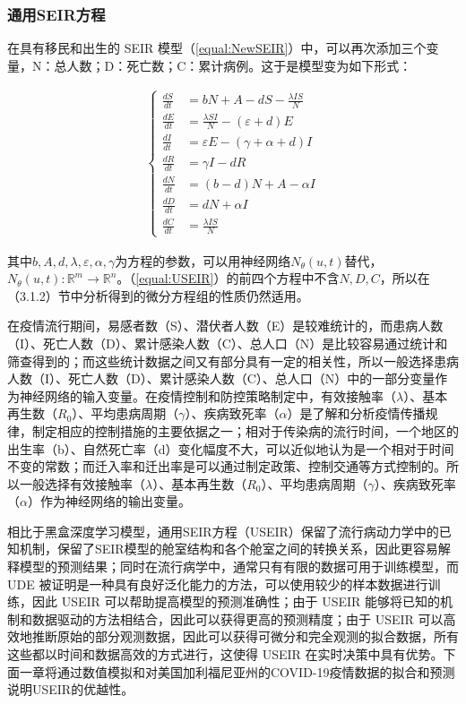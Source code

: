 \subsubsection{通用SEIR方程}

在具有移民和出生的 SEIR 模型（\ref{equal:NewSEIR}）中，可以再次添加三个变量，N：总人数；D：死亡数；C：累计病例。这于是模型变为如下形式：

\begin{gather}
    \left\{
    \begin{aligned}
    \frac{dS}{dt} & =  bN + A-dS-\frac{\lambda IS}{N} \\
    \frac{dE}{dt} & =  \frac{\lambda SI}{N} - (\varepsilon +d)E\\
    \frac{dI}{dt} & =  \varepsilon E - (\gamma +\alpha +d)I\\
    \frac{dR}{dt} & =  \gamma I - dR \\
    \frac{dN}{dt} & = (b-d)N+A-\alpha I \\
    \frac{dD}{dt} & = dN+\alpha I \\
    \frac{dC}{dt} & = \frac{\lambda IS}{N}
    \end{aligned}
    \right.
    \label{equal:USEIR}
\end{gather}

其中$b,A,d,\lambda,\varepsilon,\alpha,\gamma$为方程的参数，可以用神经网络$N_\theta(u,t)$替代，$N_\theta(u,t): \mathbb{R}^m \rightarrow \mathbb{R}^{n}$。（\ref{equal:USEIR}）的前四个方程中不含$N,D,C$，所以在（3.1.2）节中分析得到的微分方程组的性质仍然适用。

在疫情流行期间，易感者数（S）、潜伏者人数（E）是较难统计的，而患病人数（I）、死亡人数（D）、累计感染人数（C）、总人口（N）是比较容易通过统计和筛查得到的；而这些统计数据之间又有部分具有一定的相关性，所以一般选择患病人数（I）、死亡人数（D）、累计感染人数（C）、总人口（N）中的一部分变量作为神经网络的输入变量。在疫情控制和防控策略制定中，有效接触率（$\lambda $）、基本再生数（$R_0$）、平均患病周期（$\gamma$）、疾病致死率（$\alpha$）是了解和分析疫情传播规律，制定相应的控制措施的主要依据之一；相对于传染病的流行时间，一个地区的出生率（b）、自然死亡率（d）变化幅度不大，可以近似地认为是一个相对于时间不变的常数；而迁入率和迁出率是可以通过制定政策、控制交通等方式控制的。所以一般选择有效接触率（$\lambda $）、基本再生数（$R_0$）、平均患病周期（$\gamma$）、疾病致死率（$\alpha$）作为神经网络的输出变量。

相比于黑盒深度学习模型，通用SEIR方程（USEIR）保留了流行病动力学中的已知机制，保留了SEIR模型的舱室结构和各个舱室之间的转换关系，因此更容易解释模型的预测结果；同时在流行病学中，通常只有有限的数据可用于训练模型，而UDE 被证明是一种具有良好泛化能力的方法，可以使用较少的样本数据进行训练，因此 USEIR 可以帮助提高模型的预测准确性；由于 USEIR 能够将已知的机制和数据驱动的方法相结合，因此可以获得更高的预测精度；由于 USEIR 可以高效地推断原始的部分观测数据，因此可以获得可微分和完全观测的拟合数据，所有这些都以时间和数据高效的方式进行，这使得 USEIR 在实时决策中具有优势。下面一章将通过数值模拟和对美国加利福尼亚州的COVID-19疫情数据的拟合和预测说明USEIR的优越性。

